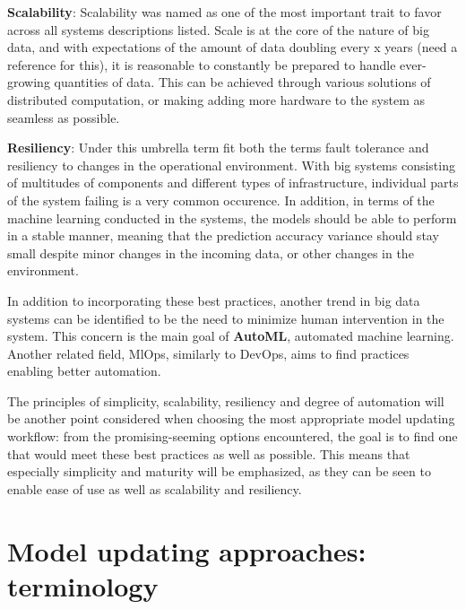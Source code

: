 \textbf{Scalability}: Scalability was named as one of the most important trait to favor across all systems descriptions listed. Scale is at the core of the nature of big data, and with expectations of the amount of data doubling every x years (need a reference for this), it is reasonable to constantly be prepared to handle ever-growing quantities of data. This can be achieved through various solutions of distributed computation, or making adding more hardware to the system as seamless as possible.
    
\textbf{Resiliency}: Under this umbrella term fit both the terms fault tolerance and resiliency to changes in the operational environment. With big systems consisting of multitudes of components and different types of infrastructure, individual parts of the system failing is a very common occurence. In addition, in terms of the machine learning conducted in the systems, the models should be able to perform in a stable manner, meaning that the prediction accuracy variance should stay small despite minor changes in the incoming data, or other changes in the environment.




In addition to incorporating these best practices, another trend in big data systems can be identified to be the need to minimize human intervention in the system. This concern is the main goal of \textbf{AutoML}, automated machine learning. Another related field, MlOps, similarly to DevOps, aims to find practices enabling better automation.

The principles of simplicity, scalability, resiliency and degree of automation will be another point considered when choosing the most appropriate model updating workflow: from the promising-seeming options encountered, the goal is to find one that would meet these best practices as well as possible. This means that especially simplicity and maturity will be emphasized, as they can be seen to enable ease of use as well as scalability and resiliency. 

\section{Model updating approaches: terminology}

